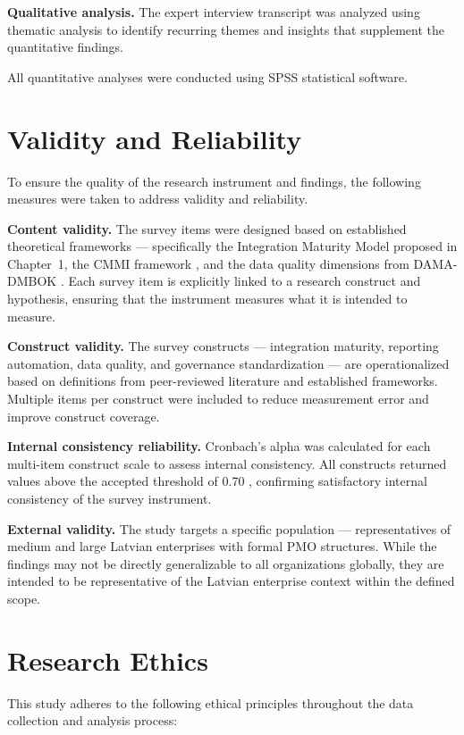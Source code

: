 \textbf{Qualitative analysis.} The expert interview transcript was analyzed
using thematic analysis to identify recurring themes and insights that
supplement the quantitative findings.

All quantitative analyses were conducted using SPSS statistical software.

\section{Validity and Reliability}
\label{sec:validity}

To ensure the quality of the research instrument and findings, the following
measures were taken to address validity and reliability.

\textbf{Content validity.} The survey items were designed based on established
theoretical frameworks --- specifically the Integration Maturity Model proposed
in Chapter~1, the CMMI framework \cite{paulk1993}, and the data quality
dimensions from DAMA-DMBOK \cite{dama2017}. Each survey item is explicitly
linked to a research construct and hypothesis, ensuring that the instrument
measures what it is intended to measure.

\textbf{Construct validity.} The survey constructs --- integration maturity,
reporting automation, data quality, and governance standardization --- are
operationalized based on definitions from peer-reviewed literature and
established frameworks. Multiple items per construct were included to reduce
measurement error and improve construct coverage.

\textbf{Internal consistency reliability.} Cronbach's alpha was calculated
for each multi-item construct scale to assess internal consistency. All
constructs returned values above the accepted threshold of 0.70
\cite{field2018}, confirming satisfactory internal consistency of the
survey instrument.

\textbf{External validity.} The study targets a specific population ---
representatives of medium and large Latvian enterprises with formal PMO
structures. While the findings may not be directly generalizable to all
organizations globally, they are intended to be representative of the
Latvian enterprise context within the defined scope.

\section{Research Ethics}
\label{sec:ethics}

This study adheres to the following ethical principles throughout the data
collection and analysis process:


